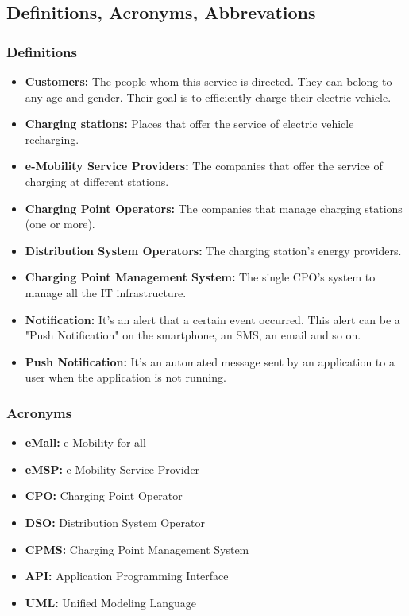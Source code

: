 \subsection{Definitions, Acronyms, Abbrevations}
\subsubsection{Definitions}
\begin{itemize}
        \item \textbf{Customers:} The people whom this service is directed. 
        They can belong to any age and gender. \label{Customer}
        Their goal is to efficiently charge their electric vehicle.        
        \item \textbf{Charging stations:} Places that offer the service of electric vehicle recharging.
        \item \textbf{e-Mobility Service Providers:} The companies that offer the service of charging at different stations.
        \item \textbf{Charging Point Operators:} The companies that manage charging stations (one or more).\label{CPO}
        \item \textbf{Distribution System Operators:} The charging station's energy providers.\label{DSO}
        \item \textbf{Charging Point Management System:} The single CPO's system to manage all the IT infrastructure.
        \item \textbf{Notification:} It's an alert that a certain event occurred. 
        This alert can be a "Push Notification" on the smartphone, an SMS, an email and so on.
        \item \textbf{Push Notification:} It's an automated message sent by an application to a user when the application is not running.
\end{itemize}
\subsubsection{Acronyms}
\begin{itemize}
        \item \textbf{eMall:} e-Mobility for all
        \item \textbf{eMSP:} e-Mobility Service Provider
        \item \textbf{CPO:} Charging Point Operator
        \item \textbf{DSO:} Distribution System Operator
        \item \textbf{CPMS:} Charging Point Management System
        \item \textbf{API:} Application Programming Interface
        \item \textbf{UML:} Unified Modeling Language
\end{itemize}
